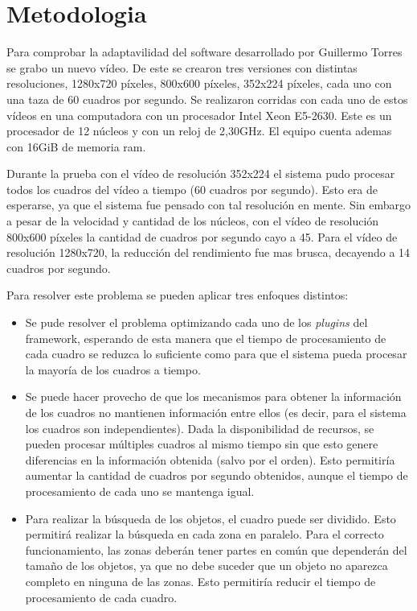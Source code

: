 
\section{Metodologia}

Para comprobar la adaptavilidad del software desarrollado por Guillermo Torres
se grabo un nuevo vídeo. De este se crearon tres versiones con distintas
resoluciones, 1280x720 píxeles, 800x600 píxeles, 352x224 píxeles, cada uno con
una taza de 60 cuadros por segundo. Se realizaron corridas con cada uno de estos
vídeos en una computadora con un procesador Intel Xeon E5-2630. Este es un
procesador de 12 núcleos y con un reloj de 2,30GHz. El equipo cuenta ademas con
16GiB de memoria ram.

Durante la prueba con el vídeo de resolución 352x224 el sistema pudo procesar
todos los cuadros del vídeo a tiempo (60 cuadros por segundo). Esto era de
esperarse, ya que el sistema fue pensado con tal resolución en mente. Sin
embargo a pesar de la velocidad y cantidad de los núcleos, con el vídeo de
resolución 800x600 píxeles la cantidad de cuadros por segundo cayo a 45. Para el
vídeo de resolución 1280x720, la reducción del rendimiento fue mas brusca,
decayendo a 14 cuadros por segundo.

Para resolver este problema se pueden aplicar tres enfoques distintos:

\begin{itemize}

\item	Se pude resolver el problema optimizando cada uno de los \emph{plugins}
	del framework, esperando de esta manera que el tiempo de procesamiento
	de cada cuadro se reduzca lo suficiente como para que el sistema pueda
	procesar la mayoría de los cuadros a tiempo.

\item	Se puede hacer provecho de que los mecanismos para obtener la
	información de los cuadros no mantienen información entre ellos (es
	decir, para el sistema los cuadros son independientes). Dada la
	disponibilidad de recursos, se pueden procesar múltiples cuadros al
	mismo tiempo sin que esto genere diferencias en la información obtenida
	(salvo por el orden). Esto permitiría aumentar la cantidad de cuadros
	por segundo obtenidos, aunque el tiempo de procesamiento de cada uno se
	mantenga igual.

\item	Para realizar la búsqueda de los objetos, el cuadro puede ser dividido.
	Esto permitirá realizar la búsqueda en cada zona en paralelo. Para el
	correcto funcionamiento, las zonas deberán tener partes en común que
	dependerán del tamaño de los objetos, ya que no debe suceder que un
	objeto no aparezca completo en ninguna de las zonas. Esto permitiría
	reducir el tiempo de procesamiento de cada cuadro.

\end{itemize}

